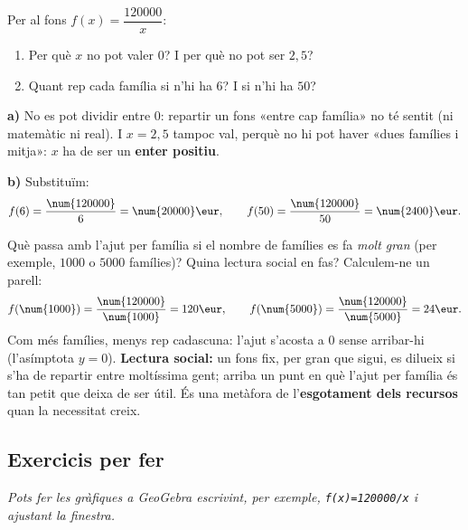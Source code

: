 \begin{exresolt}
Per al fons $f(x)=\dfrac{\num{120000}}{x}$:
\begin{enumerate}[label=\alph*), leftmargin=1.6em]
  \item Per què $x$ no pot valer $0$? I per què no pot ser $2,5$?
  \item Quant rep cada família si n'hi ha $6$? I si n'hi ha $50$?
\end{enumerate}
\solucio
\textbf{a)} No es pot dividir entre $0$: repartir un fons «entre cap família» no té
sentit (ni matemàtic ni real). I $x=2,5$ tampoc val, perquè no hi pot haver «dues
famílies i mitja»: $x$ ha de ser un \textbf{enter positiu}.

\textbf{b)} Substituïm:
\[
f(6)=\frac{\num{120000}}{6}=\num{20000}\eur,\qquad
f(50)=\frac{\num{120000}}{50}=\num{2400}\eur.
\]
\end{exresolt}

\begin{exresolt}
Què passa amb l'ajut per família si el nombre de famílies es fa \emph{molt gran}
(per exemple, $\num{1000}$ o $\num{5000}$ famílies)? Quina lectura social en fas?
\solucio
Calculem-ne un parell:
\[
f(\num{1000})=\frac{\num{120000}}{\num{1000}}=120\eur,\qquad
f(\num{5000})=\frac{\num{120000}}{\num{5000}}=24\eur.
\]
Com més famílies, menys rep cadascuna: l'ajut s'acosta a $0$ sense arribar-hi
(l'asímptota $y=0$). \textbf{Lectura social:} un fons fix, per gran que sigui, es
dilueix si s'ha de repartir entre moltíssima gent; arriba un punt en què l'ajut per
família és tan petit que deixa de ser útil. És una metàfora de l'\textbf{esgotament
dels recursos} quan la necessitat creix.
\end{exresolt}

\subsection{Exercicis per fer}

\noindent\textit{Pots fer les gràfiques a GeoGebra escrivint, per exemple,
\texttt{f(x)=120000/x} i ajustant la finestra.}

